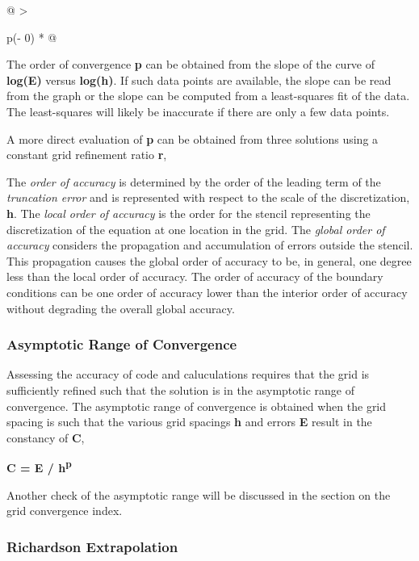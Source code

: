 \begin{longtable}[]{@{}
  >{\raggedright\arraybackslash}p{(\columnwidth - 0\tabcolsep) * }@{}}
\begin{minipage}[t]{\linewidth}
The order of convergence \textbf{p} can be obtained from the slope of
the curve of \textbf{log(E)} versus \textbf{log(h)}. If such data points
are available, the slope can be read from the graph or the slope can be
computed from a least-squares fit of the data. The least-squares will
likely be inaccurate if there are only a few data points.

A more direct evaluation of \textbf{p} can be obtained from three
solutions using a constant grid refinement ratio \textbf{r},


The \emph{order of accuracy} is determined by the order of the leading
term of the \emph{truncation error} and is represented with respect to
the scale of the discretization, \textbf{h}. The \emph{local order of
accuracy} is the order for the stencil representing the discretization
of the equation at one location in the grid. The \emph{global order of
accuracy} considers the propagation and accumulation of errors outside
the stencil. This propagation causes the global order of accuracy to be,
in general, one degree less than the local order of accuracy. The order
of accuracy of the boundary conditions can be one order of accuracy
lower than the interior order of accuracy without degrading the overall
global accuracy.

\hypertarget{asymptotic-range-of-convergence}{%
\subsubsection{Asymptotic Range of
Convergence}\label{asymptotic-range-of-convergence}}

Assessing the accuracy of code and caluculations requires that the grid
is sufficiently refined such that the solution is in the asymptotic
range of convergence. The asymptotic range of convergence is obtained
when the grid spacing is such that the various grid spacings \textbf{h}
and errors \textbf{E} result in the constancy of \textbf{C},

\textbf{C = E / h\textsuperscript{p}}

Another check of the asymptotic range will be discussed in the section
on the grid convergence index.

\hypertarget{richardson-extrapolation}{%
\subsubsection{Richardson
Extrapolation}\label{richardson-extrapolation}}


\end{minipage}
\end{longtable}
